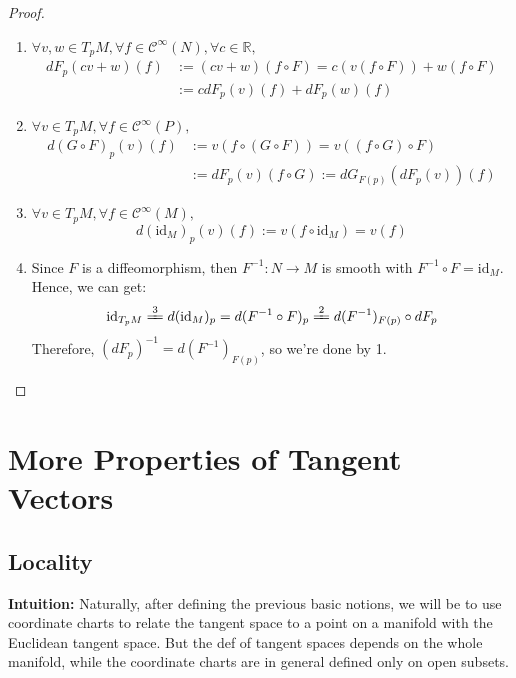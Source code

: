 \begin{proof}
    \begin{enumerate}
        \item $\forall v,w\in T_pM, \forall f\in \mathcal{C}^\infty (N), \forall c\in \mathbb{R},$
        \begin{align*}
            dF_p(cv+w)(f)&:= (cv+w) (f\circ F)= c(v(f\circ F))+ w(f\circ F)\\
            &:= cdF_p(v)(f)+dF_p(w)(f)
        \end{align*}

        \item $\forall v\in T_pM, \forall f\in \mathcal{C}^\infty (P),$
        \begin{align*}
            d(G\circ F)_p(v)(f)&:= v(f\circ (G\circ F))= v((f\circ G)\circ F)\\
            &:= dF_p(v) (f\circ G):= dG_{F(p)} (dF_p(v))(f)
        \end{align*}

        \item $\forall v\in T_pM, \forall f\in \mathcal{C}^\infty (M),$
        \[
        d(\text{id}_M)_p (v)(f):= v(f\circ \text{id}_M)= v(f)
        \]

        \item Since $F$ is a diffeomorphism, then $F^{-1}:N\to M$ is smooth with $F^{-1}\circ F=\text{id}_M$. Hence, we can get:
        \[
        \text{id}_{T_pM} \xlongequal{3} d(\text{id}_M)_p= d(F^{-1} \circ F)_p \xlongequal{2} d(F^{-1})_{F(p)} \circ dF_p
        \]
        Therefore, $(dF_p)^{-1}= d(F^{-1})_{F(p)}$, so we're done by 1.
    \end{enumerate}
\end{proof}

\section{More Properties of Tangent Vectors}

\subsection{Locality}

\noindent\textbf{Intuition:} Naturally, after defining the previous basic notions, we will be to use coordinate charts to relate the tangent space to a point on a manifold with the Euclidean tangent space. But the def of tangent spaces depends on the whole manifold, while the coordinate charts are in general defined only on open subsets.

